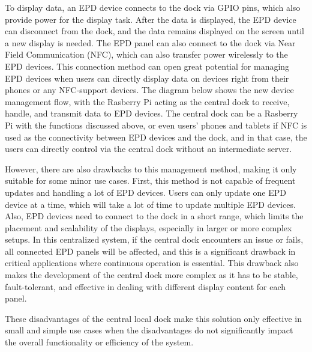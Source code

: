 \documentclass[../Main.tex]{subfiles}
\begin{document}
To display data, an EPD device connects to the dock via GPIO pins, which also provide power for the display task. After the data is displayed, the EPD device can disconnect from the dock, and the data remains displayed on the screen until a new display is needed. The EPD panel can also connect to the dock via Near Field Communication (NFC), which can also transfer power wirelessly to the EPD devices. This connection method can open great potential for managing EPD devices when users can directly display data on devices right from their phones or any NFC-support devices. The diagram below shows the new device management flow, with the Rasberry Pi acting as the central dock to receive, handle, and transmit data to EPD devices. The central dock can be a Rasberry Pi with the functions discussed above, or even users' phones and tablets if NFC is used as the connectivity between EPD devices and the dock, and in that case, the users can directly control via the central dock without an intermediate server.

However, there are also drawbacks to this management method, making it only suitable for some minor use cases. First, this method is not capable of frequent updates and handling a lot of EPD devices. Users can only update one EPD device at a time, which will take a lot of time to update multiple EPD devices. Also, EPD devices need to connect to the dock in a short range, which limits the placement and scalability of the displays, especially in larger or more complex setups. In this centralized system, if the central dock encounters an issue or fails, all connected EPD panels will be affected, and this is a significant drawback in critical applications where continuous operation is essential. This drawback also makes the development of the central dock more complex as it has to be stable, fault-tolerant, and effective in dealing with different display content for each panel.

These disadvantages of the central local dock make this solution only effective in small and simple use cases when the disadvantages do not significantly impact the overall functionality or efficiency of the system.
\end{document}
